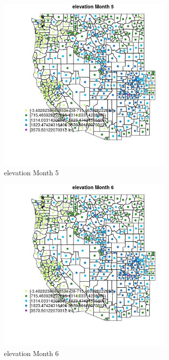 \begin{figure} 
\centering  
\includegraphics[width=0.77\textwidth]{Code_Outputs/df_report_ML_predictors_CountyCentroid_Locations_Dates_2008-01-01to2018-12-31_MapObsMo5elevation.jpg} 
\caption{\label{fig:df_report_ML_predictors_CountyCentroid_Locations_Dates_2008-01-01to2018-12-31MapObsMo5elevation}elevation Month 5} 
\end{figure} 
 

\begin{figure} 
\centering  
\includegraphics[width=0.77\textwidth]{Code_Outputs/df_report_ML_predictors_CountyCentroid_Locations_Dates_2008-01-01to2018-12-31_MapObsMo6elevation.jpg} 
\caption{\label{fig:df_report_ML_predictors_CountyCentroid_Locations_Dates_2008-01-01to2018-12-31MapObsMo6elevation}elevation Month 6} 
\end{figure} 
 

